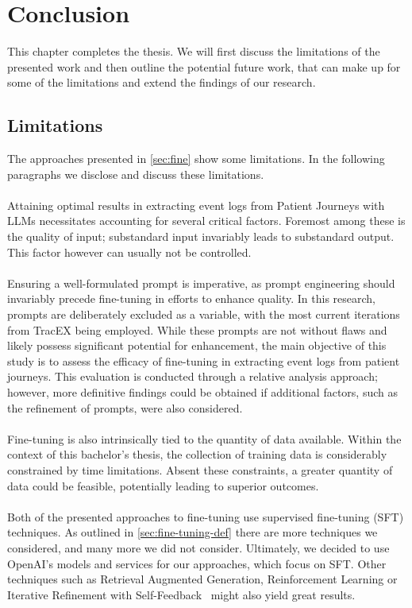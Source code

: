 \section{Conclusion}\label{sec:conclusion}
This chapter completes the thesis. We will first discuss the limitations of the presented work and then outline the potential future work, that can make up for some of the limitations and extend the findings of our research.

\subsection{Limitations}\label{sec:limitations}
The approaches presented in \autoref{sec:fine} show some limitations. In the following paragraphs we disclose and discuss these limitations.\\\\
Attaining optimal results in extracting event logs from Patient Journeys with LLMs necessitates accounting for several critical factors. Foremost among these is the quality of input; substandard input invariably leads to substandard output. This factor however can usually not be controlled.\\\\ Ensuring a well-formulated prompt is imperative, as prompt engineering should invariably precede fine-tuning in efforts to enhance quality.
In this research, prompts are deliberately excluded as a variable, with the most current iterations from TracEX being employed. While these prompts are not without flaws and likely possess significant potential for enhancement, the main objective of this study is to assess the efficacy of fine-tuning in extracting event logs from patient journeys. This evaluation is conducted through a relative analysis approach; however, more definitive findings could be obtained if additional factors, such as the refinement of prompts, were also considered.\\\\
Fine-tuning is also intrinsically tied to the quantity of data available. Within the context of this bachelor’s thesis, the collection of training data is considerably constrained by time limitations. Absent these constraints, a greater quantity of data could be feasible, potentially leading to superior outcomes.\\\\
Both of the presented approaches to fine-tuning use supervised fine-tuning (SFT) techniques. As outlined in \autoref{sec:fine-tuning-def} there are more techniques we considered, and many more we did not consider. Ultimately, we decided to use OpenAI's models and services for our approaches, which focus on SFT. Other techniques such as Retrieval Augmented Generation, Reinforcement Learning\cite{ovadia_fine-tuning_2024} or Iterative Refinement with Self-Feedback~\cite{madaan_self-refine_2023} might also yield great results.

